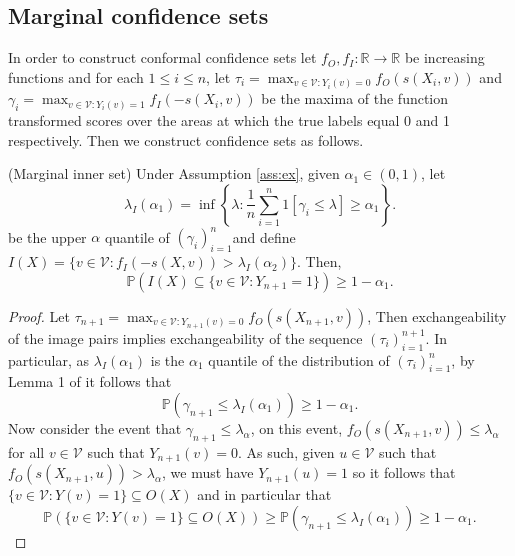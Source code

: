 \subsection{Marginal confidence sets}
In order to construct conformal confidence sets let $f_O, f_I:\mathbb{R} \rightarrow \mathbb{R}$ be increasing functions and for each $1\leq i \leq n$, let $\tau_i = \max_{v \in \mathcal{V}: Y_i(v) = 0} f_O(s(X_i,v))$ and $\gamma_i = \max_{v \in \mathcal{V}: Y_i(v) = 1} f_I(-s(X_i,v))$  be the maxima of the function transformed scores over the areas at which the true labels equal 0 and 1 respectively. Then we construct confidence sets as follows.
\begin{theorem}\label{thm:inner}
	(Marginal inner set)
	Under Assumption \ref{ass:ex}, given $\alpha_1 \in (0,1)$, let 
	\begin{equation*}
		\lambda_I(\alpha_1) = \inf\left\lbrace \lambda: \frac{1}{n} \sum_{i = 1}^n 1\left[ \gamma_i\leq \lambda \right] \geq \alpha_1 \right\rbrace.
	\end{equation*}
	be the upper $\alpha$ quantile of $(\gamma_i)_{i = 1}^n$and define $I(X) = \lbrace v \in \mathcal{V}: f_I(-s(X,v)) >\lambda_I(\alpha_2)  \rbrace $. Then,
	\begin{equation}\label{eq:probstat}
		\mathbb{P}\left( I(X) \subseteq\lbrace v\in \mathcal{V}: Y_{n+1} = 1 \rbrace \right) \geq 1 - \alpha_1.
	\end{equation}
\end{theorem}
\begin{proof}
	Let $\tau_{n+1}= \max_{v \in \mathcal{V}: Y_{n+1}(v) = 0} f_O(s(X_{n+1},v))$, Then exchangeability of the image pairs implies exchangeability of the sequence $(\tau_i)_{i = 1}^{n+1}$. In particular, as $\lambda_I(\alpha_1)$ is the $\alpha_1$ quantile of the distribution of $(\tau_i)_{i = 1}^{n}$, by Lemma 1 of \cite{} it follows that 
	\begin{equation*}
	\mathbb{P}\left(\gamma_{n+1} \leq \lambda_I(\alpha_1) \right) \geq 1 - \alpha_1. 
	\end{equation*}
	Now consider the event that $\gamma_{n+1}\leq \lambda_{\alpha}$, on this event, $ f_O(s(X_{n+1},v)) \leq \lambda_\alpha $
	for all $v \in \mathcal{V}$ such that $Y_{n+1}(v) = 0$. As such, given $u \in \mathcal{V}$ such that $ f_O(s(X_{n+1},u)) > \lambda_\alpha$, we must have $Y_{n+1}(u) = 1$ so it follows that $	\lbrace v\in \mathcal{V}: Y(v) = 1 \rbrace \subseteq O(X) $ and in particular that 
	\begin{equation*}
	\mathbb{P}\left( \lbrace v\in \mathcal{V}: Y(v) = 1 \rbrace \subseteq O(X)  \right) \geq \mathbb{P}\left(\gamma_{n+1} \leq \lambda_I(\alpha_1) \right) \geq 1 - \alpha_1. 
\end{equation*}
\end{proof}
